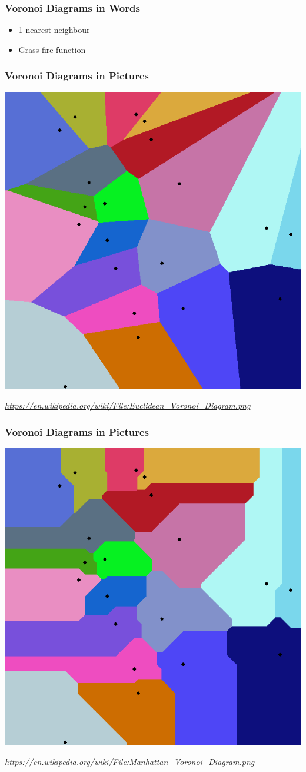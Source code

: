 \documentclass{beamer}
\newcommand\smallgray[1]{\textcolor{gray}{\small\it #1}}
\begin{document}
\begin{frame}
  \frametitle{Voronoi Diagrams in Words}

  \begin{itemize}
  \item 1-nearest-neighbour
  \item Grass fire function
  \end{itemize}
\end{frame}

\begin{frame}
  \frametitle{Voronoi Diagrams in Pictures}

  \includegraphics[width=.6\textwidth]{Euclidean_Voronoi_Diagram.png}

  \smallgray{\url{https://en.wikipedia.org/wiki/File:Euclidean_Voronoi_Diagram.png}}
\end{frame}

\begin{frame}
  \frametitle{Voronoi Diagrams in Pictures}

  \includegraphics[width=.6\textwidth]{Manhattan_Voronoi_Diagram.png}

  \smallgray{\url{https://en.wikipedia.org/wiki/File:Manhattan_Voronoi_Diagram.png}}
\end{frame}
\end{document}
